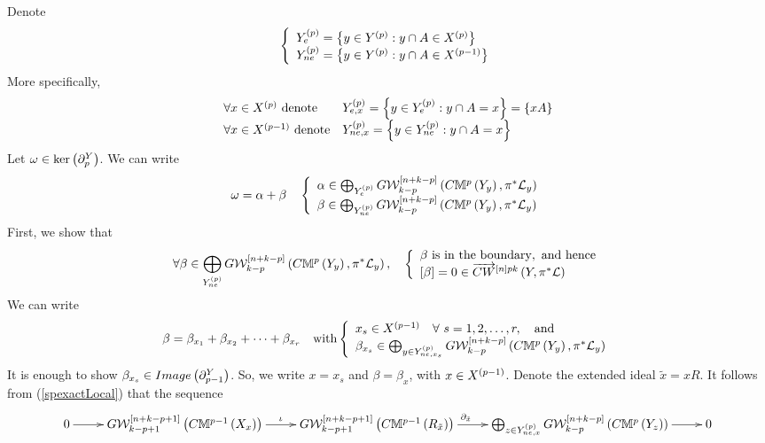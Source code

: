 \documentclass[12pt]{article}
\begin{document}
Denote 
$$
\LBrace{{l}
Y^{\LRf{p}}_{e}= \LRs{y\in Y^{\LRf{p}}: y\cap A\in X^{\LRf{p}} }\\
Y^{\LRf{p}}_{ne}= \LRs{y\in Y^{\LRf{p}}: y\cap A\in X^{\LRf{p-1}} }\\
}
$$ 
More specifically,  
$$
\begin{array}{ll}
 \forall x\in X^{\LRf{p}} ~{\rm denote}&Y^{\LRf{p}}_{e, x}= \LRs{y\in Y^{\LRf{p}}_e: y\cap A=x }=\LRs{xA}\\ %
 \forall x\in X^{\LRf{p-1}}~{\rm denote} &Y^{\LRf{p}}_{ne, x}= \LRs{y\in Y^{\LRf{p}}_{ne}: y\cap A=x }\\
\end{array}
$$ 
Let $\omega \in \ker\LRf{\partial_p^Y}$.  We can write 
$$
\omega=\alpha +\beta\quad 
\LBrace{{l}
\alpha \in  \bigoplus_{Y^{\LRf{p}}_e}G{\CW}_{k-p}^{\LRt{n+k-p}}\LRf{C{\BM}^{p}\LRf{Y_y}, \pi^*{\CL}_y}\\
\beta \in  \bigoplus_{Y^{\LRf{p}}_{ne}}G{\CW}_{k-p}^{\LRt{n+k-p}}\LRf{C{\BM}^{p}\LRf{Y_y}, \pi^*{\CL}_y}\\
}
$$
First, we show that 
\begin{equation}\label{betaBunryty}
\forall \beta\in \bigoplus_{Y^{\LRf{p}}_{ne}}
G{\CW}_{k-p}^{\LRt{n+k-p}}\LRf{C{\BM}^{p}\LRf{Y_y}, \pi^*{\CL}_y}, \quad
\LBrace{{l} \beta ~{\rm is ~in~the~boundary, ~and~ hence}\\
\LRt{\beta}=0 \in \ora{CW}^{\LRt{n}pk}\LRf{Y, \pi^*{\CL}}
}
\end{equation} 
We can write 
$$
\beta=\beta_{x_1}+\beta_{x_2}+ \cdots + \beta_{x_r} \quad {\rm with} %
\LBrace{{l}
x_s\in X^{\LRf{p-1}}\quad \forall~ s=1, 2, \ldots, r, \quad {\rm and}\\
\beta_{x_s}\in \bigoplus_{y\in Y^{\LRf{p}}_{ne, x_s}}G{\CW}_{k-p}^{\LRt{n+k-p}}\LRf{C{\BM}^{p}\LRf{Y_y}, \pi^*{\CL}_y}\\
}
$$
It is enough to show  $\beta_{x_s}\in Image\LRf{\partial^Y_{p-1}}$. So, we write $x=x_s$ and $\beta=\beta_x$, with 
$x\in X^{\LRf{p-1}}$.  Denote the extended ideal $\tilde{x}=xR$.
It follows from  (\ref{spexactLocal}) that the sequence 
{
$$
\diagram 
0 \ar[r] & {G}{\CW}^{\LRt{n+k-p+1}}_{k-p+1}\LRf{C{\BM}^{p-1}\LRf{X_{x}}}
\ar[r]^{\iota} & {G}{\CW}_{k-p+1}^{\LRt{n+k-p+1}}\LRf{C{\BM}^{p-1}\LRf{R_{\tilde{x}}}}
\ar[r]^{\partial_{\tilde{x}}\qquad} & \bigoplus _{z\in Y^{\LRf{p}}_{ne, x}}{G}{\CW}_{k-p}^{\LRt{n+k-p}}\LRf{C{\BM}^{p}\LRf{Y_z}}\ar[r] & 0\\
\enddiagram
$$
}
\end{document}
